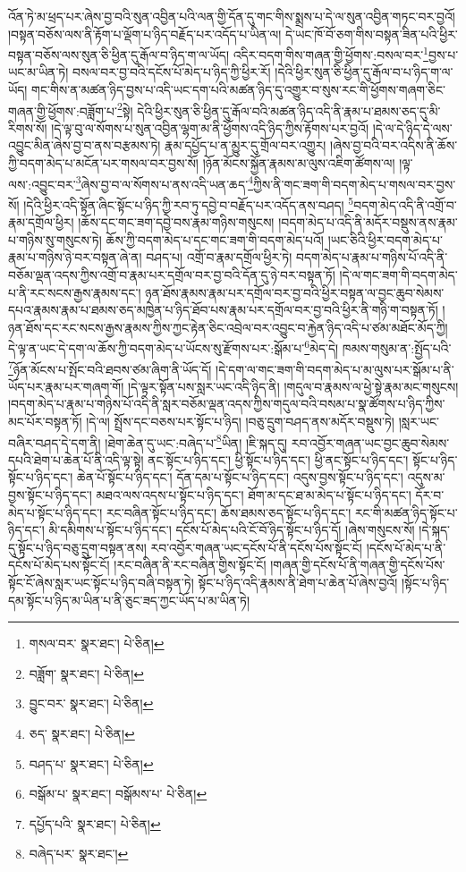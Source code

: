 འོན་ཏེ་མ་ཕྲད་པར་ཞེས་བྱ་བའི་སུན་འབྱིན་པའི་ལན་གྱི་དོན་དུ་གང་གིས་སྨྲས་པ་དེ་ལ་སུན་འབྱིན་གཏང་བར་བྱའོ། །བསྟན་བཅོས་ལས་ནི་རྟོག་པ་ལྡོག་པ་ཉིད་བརྗོད་པར་འདོད་པ་ཡིན་ལ། དེ་ཡང་ཁོ་བོ་ཅག་གིས་བསྟན་ཟིན་པའི་ཕྱིར་བསྟན་བཅོས་ལས་སུན་ཅི་ཕྱིན་དུ་རྒོལ་བ་ཉིད་ག་ལ་ཡོད། འདིར་བདག་གིས་གཞན་གྱི་ཕྱོགས་:བསལ་བར་\footnote{གསལ་བར་  སྣར་ཐང་།  པེ་ཅིན། }བྱས་པ་ཡང་མ་ཡིན་ཏེ། བསལ་བར་བྱ་བའི་དངོས་པོ་མེད་པ་ཉིད་ཀྱི་ཕྱིར་རོ། །དེའི་ཕྱིར་སུན་ཅི་ཕྱིན་དུ་རྒོལ་བ་པ་ཉིད་ག་ལ་ཡོད། གང་གིས་ན་མཚན་ཉིད་བྱས་པ་འདི་ཡང་དག་པའི་མཚན་ཉིད་དུ་འགྱུར་བ་སུས་རང་གི་ཕྱོགས་གཞག་ཅིང་གཞན་གྱི་ཕྱོགས་:བཟློག་པ་\footnote{བཟློག་  སྣར་ཐང་།  པེ་ཅིན། }སྟེ། དེའི་ཕྱིར་སུན་ཅི་ཕྱིན་དུ་རྒོལ་བའི་མཚན་ཉིད་འདི་ནི་རྣམ་པ་ཐམས་ཅད་དུ་མི་རིགས་སོ། །དེ་ལྟ་བུ་ལ་སོགས་པ་སུན་འབྱིན་ལྷག་མ་ནི་ཕྱོགས་འདི་ཉིད་ཀྱིས་རྟོགས་པར་བྱའོ། །དེ་ལ་དེ་ཉིད་དེ་ལས་འབྱུང་མིན་ཞེས་བྱ་བ་ནས་བརྩམས་ཏེ། རྣམ་དཔྱོད་པ་ན་མྱུར་དུ་གྲོལ་བར་འགྱུར། །ཞེས་བྱ་བའི་བར་འདིས་ནི་ཆོས་ཀྱི་བདག་མེད་པ་མངོན་པར་གསལ་བར་བྱས་སོ། །ཉོན་མོངས་སྐྱོན་རྣམས་མ་ལུས་འཇིག་ཚོགས་ལ། །ལྟ་ལས་:འབྱུང་བར་\footnote{བྱུང་བར་  སྣར་ཐང་།  པེ་ཅིན། }ཞེས་བྱ་བ་ལ་སོགས་པ་ནས་འདི་ཡན་ཆད་\footnote{ཅད་  སྣར་ཐང་།  པེ་ཅིན། }ཀྱིས་ནི་གང་ཟག་གི་བདག་མེད་པ་གསལ་བར་བྱས་སོ། །དེའི་ཕྱིར་འདི་སྟོན་ཞིང་སྟོང་པ་ཉིད་ཀྱི་རབ་ཏུ་དབྱེ་བ་བརྗོད་པར་འདོད་ནས་བཤད། \footnote{བཤད་པ་  སྣར་ཐང་།  པེ་ཅིན། }བདག་མེད་འདི་ནི་འགྲོ་བ་རྣམ་དགྲོལ་ཕྱིར། །ཆོས་དང་གང་ཟག་དབྱེ་བས་རྣམ་གཉིས་གསུངས། །བདག་མེད་པ་འདི་ནི་མདོར་བསྡུས་ནས་རྣམ་པ་གཉིས་སུ་གསུངས་ཏེ། ཆོས་ཀྱི་བདག་མེད་པ་དང་གང་ཟག་གི་བདག་མེད་པའོ། །ཡང་ཅིའི་ཕྱིར་བདག་མེད་པ་རྣམ་པ་གཉིས་ཉེ་བར་བསྟན་ཞེ་ན། བཤད་པ། འགྲོ་བ་རྣམ་དགྲོལ་ཕྱིར་ཏེ། བདག་མེད་པ་རྣམ་པ་གཉིས་པོ་འདི་ནི་བཅོམ་ལྡན་འདས་ཀྱིས་འགྲོ་བ་རྣམ་པར་དགྲོལ་བར་བྱ་བའི་དོན་དུ་ཉེ་བར་བསྟན་ཏོ། །དེ་ལ་གང་ཟག་གི་བདག་མེད་པ་ནི་རང་སངས་རྒྱས་རྣམས་དང་། ཉན་ཐོས་རྣམས་རྣམ་པར་དགྲོལ་བར་བྱ་བའི་ཕྱིར་བསྟན་ལ་བྱང་ཆུབ་སེམས་དཔའ་རྣམས་རྣམ་པ་ཐམས་ཅད་མཁྱེན་པ་ཉིད་ཐོབ་པས་རྣམ་པར་དགྲོལ་བར་བྱ་བའི་ཕྱིར་ནི་གཉི་ག་བསྟན་ཏོ། །ཉན་ཐོས་དང་རང་སངས་རྒྱས་རྣམས་ཀྱིས་ཀྱང་རྟེན་ཅིང་འབྲེལ་བར་འབྱུང་བ་རྐྱེན་ཉིད་འདི་པ་ཙམ་མཐོང་མོད་ཀྱི། དེ་ལྟ་ན་ཡང་དེ་དག་ལ་ཆོས་ཀྱི་བདག་མེད་པ་ཡོངས་སུ་རྫོགས་པར་:སྒོམ་པ་\footnote{བསྒོམ་པ་  སྣར་ཐང་། བསྒོམས་པ་  པེ་ཅིན། }མེད་དེ། ཁམས་གསུམ་ན་:སྤྱོད་པའི་\footnote{དཔྱོད་པའི་  སྣར་ཐང་།  པེ་ཅིན། }ཉོན་མོངས་པ་སྤོང་བའི་ཐབས་ཙམ་ཞིག་ནི་ཡོད་དོ། །དེ་དག་ལ་གང་ཟག་གི་བདག་མེད་པ་མ་ལུས་པར་སྒོམ་པ་ནི་ཡོད་པར་རྣམ་པར་གཞག་གོ། །དེ་ལྟར་སྟོན་པས་སླར་ཡང་འདི་ཉིད་ནི། །གདུལ་བ་རྣམས་ལ་ཕྱེ་སྟེ་རྣམ་མང་གསུངས། །བདག་མེད་པ་རྣམ་པ་གཉིས་པོ་འདི་ནི་སླར་བཅོམ་ལྡན་འདས་ཀྱིས་གདུལ་བའི་བསམ་པ་སྣ་ཚོགས་པ་ཉིད་ཀྱིས་མང་པོར་བསྟན་ཏོ། །དེ་ལ། སྤྲོས་དང་བཅས་པར་སྟོང་པ་ཉིད། །བཅུ་དྲུག་བཤད་ནས་མདོར་བསྡུས་ཏེ། །སླར་ཡང་བཞིར་བཤད་དེ་དག་ནི། །ཐེག་ཆེན་དུ་ཡང་:བཞེད་པ་\footnote{བཞེད་པར་  སྣར་ཐང་། }ཡིན། །ཇི་སྐད་དུ། རབ་འབྱོར་གཞན་ཡང་བྱང་ཆུབ་སེམས་དཔའི་ཐེག་པ་ཆེན་པོ་ནི་འདི་ལྟ་སྟེ། ནང་སྟོང་པ་ཉིད་དང་། ཕྱི་སྟོང་པ་ཉིད་དང་། ཕྱི་ནང་སྟོང་པ་ཉིད་དང་། སྟོང་པ་ཉིད་སྟོང་པ་ཉིད་དང་། ཆེན་པོ་སྟོང་པ་ཉིད་དང་། དོན་དམ་པ་སྟོང་པ་ཉིད་དང་། འདུས་བྱས་སྟོང་པ་ཉིད་དང་། འདུས་མ་བྱས་སྟོང་པ་ཉིད་དང་། མཐའ་ལས་འདས་པ་སྟོང་པ་ཉིད་དང་། ཐོག་མ་དང་ཐ་མ་མེད་པ་སྟོང་པ་ཉིད་དང་། དོར་བ་མེད་པ་སྟོང་པ་ཉིད་དང་། རང་བཞིན་སྟོང་པ་ཉིད་དང་། ཆོས་ཐམས་ཅད་སྟོང་པ་ཉིད་དང་། རང་གི་མཚན་ཉིད་སྟོང་པ་ཉིད་དང་། མི་དམིགས་པ་སྟོང་པ་ཉིད་དང་། དངོས་པོ་མེད་པའི་ངོ་བོ་ཉིད་སྟོང་པ་ཉིད་དོ། །ཞེས་གསུངས་སོ། །དེ་སྐད་དུ་སྟོང་པ་ཉིད་བཅུ་དྲུག་བསྟན་ནས། རབ་འབྱོར་གཞན་ཡང་དངོས་པོ་ནི་དངོས་པོས་སྟོང་ངོ། །དངོས་པོ་མེད་པ་ནི་དངོས་པོ་མེད་པས་སྟོང་ངོ། །རང་བཞིན་ནི་རང་བཞིན་གྱིས་སྟོང་ངོ། །གཞན་གྱི་དངོས་པོ་ནི་གཞན་གྱི་དངོས་པོས་སྟོང་ངོ་ཞེས་སླར་ཡང་སྟོང་པ་ཉིད་བཞི་བསྟན་ཏེ། སྟོང་པ་ཉིད་འདི་རྣམས་ནི་ཐེག་པ་ཆེན་པོ་ཞེས་བྱའོ། །སྟོང་པ་ཉིད་དམ་སྟོང་པ་ཉིད་མ་ཡིན་པ་ནི་ཅུང་ཟད་ཀྱང་ཡོད་པ་མ་ཡིན་ཏེ། 